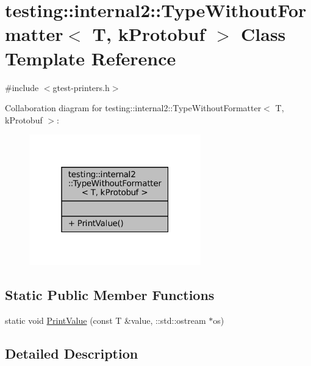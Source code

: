 \hypertarget{classtesting_1_1internal2_1_1TypeWithoutFormatter_3_01T_00_01kProtobuf_01_4}{}\section{testing\+:\+:internal2\+:\+:Type\+Without\+Formatter$<$ T, k\+Protobuf $>$ Class Template Reference}
\label{classtesting_1_1internal2_1_1TypeWithoutFormatter_3_01T_00_01kProtobuf_01_4}


{\ttfamily \#include $<$gtest-\/printers.\+h$>$}



Collaboration diagram for testing\+:\+:internal2\+:\+:Type\+Without\+Formatter$<$ T, k\+Protobuf $>$\+:
\nopagebreak
\begin{figure}[H]
\begin{center}
\leavevmode
\includegraphics[width=211pt]{classtesting_1_1internal2_1_1TypeWithoutFormatter_3_01T_00_01kProtobuf_01_4__coll__graph}
\end{center}
\end{figure}
\subsection*{Static Public Member Functions}
\begin{DoxyCompactItemize}
\item 
static void \hyperlink{classtesting_1_1internal2_1_1TypeWithoutFormatter_3_01T_00_01kProtobuf_01_4_ac96fb775dc776f02da9a671ea0e04599}{Print\+Value} (const T \&value, \+::std\+::ostream $\ast$os)
\end{DoxyCompactItemize}


\subsection{Detailed Description}
